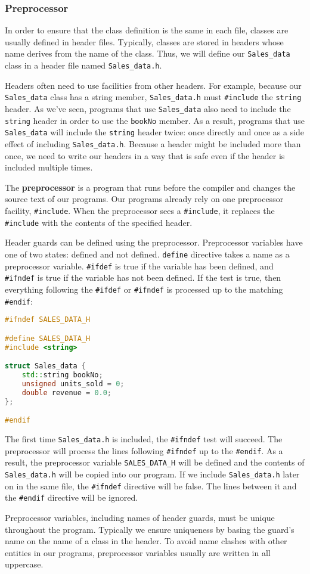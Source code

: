 \subsubsection{Preprocessor}

In order to ensure that the class definition is the same in each file, classes are usually defined in header files. Typically, classes are stored in headers whose name derives from the name of the class. Thus, we will define our \texttt{Sales_data} class in a header file named \texttt{Sales_data.h}.

Headers often need to use facilities from other headers. For example, because our \texttt{Sales\_data} class has a string member, \texttt{Sales\_data.h} must \texttt{#include} the \texttt{string} header. As we’ve seen, programs that use \texttt{Sales\_data} also need to include the \texttt{string} header in order to use the \texttt{bookNo} member. As a result, programs that use \texttt{Sales\_data} will include the \texttt{string} header twice: once directly and once as a side effect of including \texttt{Sales\_data.h}. Because a header might be included more than once, we need to write our headers in a way that is safe even if the header is included multiple times.

The \textbf{preprocessor} is a program that runs before the compiler and changes the source text of our programs. Our programs already rely on one preprocessor facility, \texttt{#include}. When the preprocessor sees a \texttt{#include}, it replaces the \texttt{#include} with the contents of the specified header.

Header guards can be defined using the preprocessor. Preprocessor variables have one of two states: defined and not defined. \texttt{define} directive takes a name as a preprocessor variable. \texttt{#ifdef} is true if the variable has been defined, and \texttt{#ifndef} is true if the variable has not been defined. If the test is true, then everything following the \texttt{#ifdef} or \texttt{#ifndef} is processed up to the matching \texttt{#endif}:
\begin{lstlisting}[language=C++]
#ifndef SALES_DATA_H 

#define SALES_DATA_H 
#include <string> 

struct Sales_data { 
    std::string bookNo; 
    unsigned units_sold = 0; 
    double revenue = 0.0; 
};

#endif
\end{lstlisting}
The first time \texttt{Sales\_data.h} is included, the \texttt{#ifndef} test will succeed. The preprocessor will process the lines following \texttt{#ifndef} up to the \texttt{#endif}. As a result, the preprocessor variable \texttt{SALES\_DATA\_H} will be defined and the contents of \texttt{Sales\_data.h} will be copied into our program. If we include \texttt{Sales\_data.h} later on in the same file, the \texttt{#ifndef} directive will be false. The lines between it and the \texttt{#endif} directive will be ignored.

Preprocessor variables, including names of header guards, must be unique throughout the program. Typically we ensure uniqueness by basing the guard’s name on the name of a class in the header. To avoid name clashes with other entities in our programs, preprocessor variables usually are written in all uppercase.